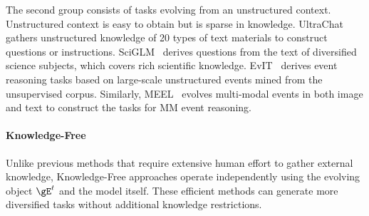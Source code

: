 \documentclass[sn-basic, Numbered]{sn-jnl}%
\theoremstyle{thmstyleone}%
\theoremstyle{thmstyletwo}%
\theoremstyle{thmstylethree}%
\begin{document}
The second group consists of tasks evolving from an unstructured context. Unstructured context is easy to obtain but is sparse in knowledge.
UltraChat~\cite{ding2023enhancing} gathers unstructured knowledge of 20 types of text materials to construct questions or instructions. 
SciGLM~\cite{zhang2024sciglm} derives questions from the text of diversified science subjects, which covers rich scientific knowledge.
EvIT~\cite{tao2024evit} derives event reasoning tasks based on large-scale unstructured events mined from the unsupervised corpus.
Similarly, MEEL~\cite{tao2024meel} evolves multi-modal events in both image and text to construct the tasks for MM event reasoning.






\noindent\paragraph{Knowledge-Free}
Unlike previous methods that require extensive human effort to gather external knowledge, Knowledge-Free approaches operate independently using the evolving object $\gE^{t}$ and the model itself. These efficient methods can generate more diversified tasks without additional knowledge restrictions.
\end{document}
